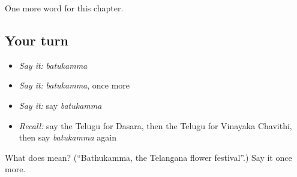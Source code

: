 \begin{grammarlens}[title={What you've built}]
One more word for this chapter.
\end{grammarlens}

\subsection*{Your turn}
\begin{itemize}
\raggedright
  \item \emph{Say it:} \emph{batukamma}
  \item \emph{Say it:} \emph{batukamma}, once more
  \item \emph{Say it:} say \emph{batukamma}
  \item \emph{Recall:} say the Telugu for Dasara, then the Telugu for Vinayaka Chavithi, then say \emph{batukamma} again
\end{itemize}

\begin{tcolorbox}[breakable,colback=teal!4,colframe=teal!35!black,title={Before you move on}]
What does  mean? (\textquotedblleft{}Bathukamma, the Telangana flower festival\textquotedblright{}.) Say it once more.
\end{tcolorbox}
